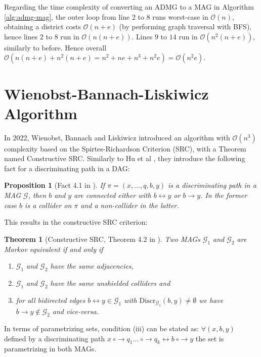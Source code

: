 \documentclass[a4paper]{article}
\newtheorem{theorem}{Theorem}
\newtheorem{proposition}{Proposition}
\begin{document}
Regarding the time complexity of converting an ADMG to a MAG in Algorithm \ref{alg:admg-mag}, the outer loop from line $2$ to $8$ runs worst-case in $\mathcal{O}(n)$, obtaining a district costs $\mathcal{O}(n+e)$ (by performing graph traversal with BFS), hence lines $2$ to $8$ run in $\mathcal{O}(n(n+e))$. Lines $9$ to $14$ run in $\mathcal{O}(n^2(n+e))$, similarly to before. Hence overall $\mathcal{O}(n(n+e) + n^2(n+e) = n^2 + ne + n^3 + n^2 e) = \mathcal{O}(n^2 e)$. \\

\section{Wienobst-Bannach-Liskiwicz \cite{wienobst2022} Algorithm}

In 2022, Wienobst, Bannach and Liskiwicz introduced an algorithm with $\mathcal{O}(n^3)$ complexity based on the Spirtes-Richardson Criterion (SRC), with a Theorem named Constructive SRC. Similarly to Hu et al \cite{hu2020}, they introduce the following fact for a discriminating path in a DAG:

\begin{proposition}[Fact 4.1 in \cite{wienobst2022}]
	If $\pi = (x,\ldots,q,b,y)$ is a discriminating path in a MAG $\mathcal{G}$, then $b$ and $y$ are connected either with $b \leftrightarrow y$ or $b \rightarrow y$. In the former case $b$ is a collider on $\pi$ and a non-collider in the latter.
\end{proposition}

This results in the constructive SRC criterion:

\begin{theorem}[Constructive SRC, Theorem 4.2 in \cite{wienobst2022}]\label{thm:constr-src}Two MAGs $\mathcal{G}_1$ and $\mathcal{G}_2$ are Markov equivalent if and only if 
	\begin{enumerate}
		\item $\mathcal{G}_1$ and $\mathcal{G}_2$ have the same adjacencies,
		\item $\mathcal{G}_1$ and $\mathcal{G}_2$ have the same unshielded colliders and 
		\item for all bidirected edges $b \leftrightarrow y \in \mathcal{G}_1$ with $\text{Discr}_{\mathcal{G}_1}(b,y) \neq \emptyset$ we have $b \rightarrow y \not \in \mathcal{G}_2$ and vice-versa.
	\end{enumerate}
\end{theorem}

In terms of parametrizing sets, condition (iii) can be stated as: $\forall (x,b,y)$ defined by a discriminating path $x ~\circ \rightarrow q_1 \ldots ~\circ\rightarrow q_k \leftrightarrow b ~\circ \rightarrow y$ the set is parametrizing in both MAGs.
\end{document}
